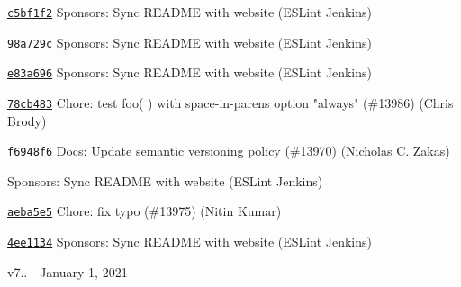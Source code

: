 \begin{DoxyItemize}
\item \href{https://github.com/eslint/eslint/commit/c5bf1f2150a9fbbb9e74c04808dc3bfeda1ed321}{\texttt{ {\ttfamily c5bf1f2}}} Sponsors\+: Sync README with website (ESLint Jenkins)
\item \href{https://github.com/eslint/eslint/commit/98a729c9def54cee9e5478e75e8bd6f28167d5e8}{\texttt{ {\ttfamily 98a729c}}} Sponsors\+: Sync README with website (ESLint Jenkins)
\item \href{https://github.com/eslint/eslint/commit/e83a6962b51b05c2ddfe42b0748b405d515eeb9d}{\texttt{ {\ttfamily e83a696}}} Sponsors\+: Sync README with website (ESLint Jenkins)
\item \href{https://github.com/eslint/eslint/commit/78cb48345c725e9f90fd0e631c476802244df4a4}{\texttt{ {\ttfamily 78cb483}}} Chore\+: test {\ttfamily foo( )} with space-\/in-\/parens option "{}always"{} (\#13986) (Chris Brody)
\item \href{https://github.com/eslint/eslint/commit/f6948f6bdc763dca0787bb2786bc9f6f9ed88f43}{\texttt{ {\ttfamily f6948f6}}} Docs\+: Update semantic versioning policy (\#13970) (Nicholas C. Zakas)
\item \href{https://github.com/eslint/eslint/commit/068821248e2d2eff11152f270102d537d8fa8126}{\texttt{ {}}} Sponsors\+: Sync README with website (ESLint Jenkins)
\item \href{https://github.com/eslint/eslint/commit/aeba5e5e6062095a06d9b867d7e7ee75422f25b9}{\texttt{ {\ttfamily aeba5e5}}} Chore\+: fix typo (\#13975) (Nitin Kumar)
\item \href{https://github.com/eslint/eslint/commit/4ee113414bdcbea240a5d9db27da6a10df472005}{\texttt{ {\ttfamily 4ee1134}}} Sponsors\+: Sync README with website (ESLint Jenkins)
\end{DoxyItemize}

v7.. -\/ January 1, 2021


